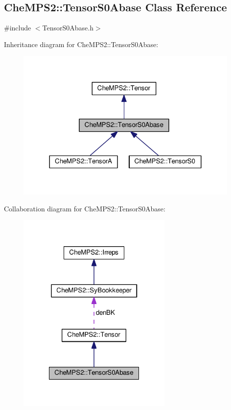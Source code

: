\hypertarget{classCheMPS2_1_1TensorS0Abase}{\subsection{Che\-M\-P\-S2\-:\-:Tensor\-S0\-Abase Class Reference}
\label{classCheMPS2_1_1TensorS0Abase}
}


{\ttfamily \#include $<$Tensor\-S0\-Abase.\-h$>$}



Inheritance diagram for Che\-M\-P\-S2\-:\-:Tensor\-S0\-Abase\-:\nopagebreak
\begin{figure}[H]
\begin{center}
\leavevmode
\includegraphics[width=312pt]{classCheMPS2_1_1TensorS0Abase__inherit__graph}
\end{center}
\end{figure}


Collaboration diagram for Che\-M\-P\-S2\-:\-:Tensor\-S0\-Abase\-:\nopagebreak
\begin{figure}[H]
\begin{center}
\leavevmode
\includegraphics[width=216pt]{classCheMPS2_1_1TensorS0Abase__coll__graph}
\end{center}
\end{figure}
